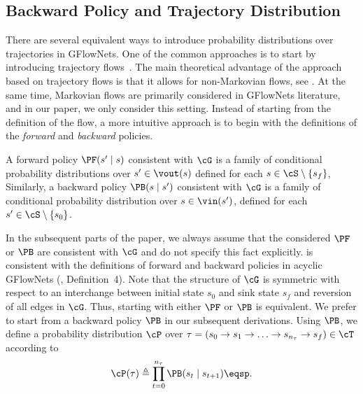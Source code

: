 \subsection{Backward Policy and Trajectory Distribution}
There are several equivalent ways to introduce probability distributions over trajectories in GFlowNets. One of the common approaches is to start by introducing trajectory flows~\cite{bengio2023gflownet}. The main theoretical advantage of the approach based on trajectory flows is that it allows for non-Markovian flows, see \cite{bengio2023gflownet}. At the same time, Markovian flows are primarily considered in GFlowNets literature, and in our paper, we only consider this setting. Instead of starting from the definition of the flow, a more intuitive approach is to begin with the definitions of the \emph{forward} and \emph{backward} policies.
\begin{definition}
\label{def:backward_policy}
A forward policy $\PF(s' \mid s)$ consistent with $\cG$ is a family of conditional probability distributions over $s' \in \vout(s)$ defined for each $s \in \cS \setminus \{s_f\}$, Similarly, a backward policy $\PB(s \mid s')$ consistent with $\cG$ is a family of conditional probability distribution over $s \in \vin(s')$, defined for each $s' \in \cS \setminus \{s_0\}$.
\end{definition}

\vspace{-0.1cm}
In the subsequent parts of the paper, we always assume that the considered $\PF$ or $\PB$ are consistent with $\cG$ and do not specify this fact explicitly.  is consistent with the definitions of forward and backward policies in acyclic GFlowNets (\citealp{bengio2023gflownet}, Definition~4). Note that the structure of $\cG$ is symmetric with respect to an interchange between initial state $s_0$ and sink state $s_f$ and reversion of all edges in $\cG$. Thus, starting with either $\PF$ or $\PB$ is equivalent. We prefer to start from a backward policy $\PB$ in our subsequent derivations. Using $\PB$, we define a probability distribution $\cP$ over $\tau = \left(s_0 \to s_1 \to \ldots \to s_{n_{\tau}} \to s_f\right) \in \cT$ according to
\vspace{-0.2cm}
\begin{equation}
\label{eq:backward_distribution}
\cP(\tau) \triangleq \prod_{t = 0}^{n_\tau} \PB(s_t \mid s_{t + 1})\eqsp.
\end{equation}
\vspace{-0.4cm}

